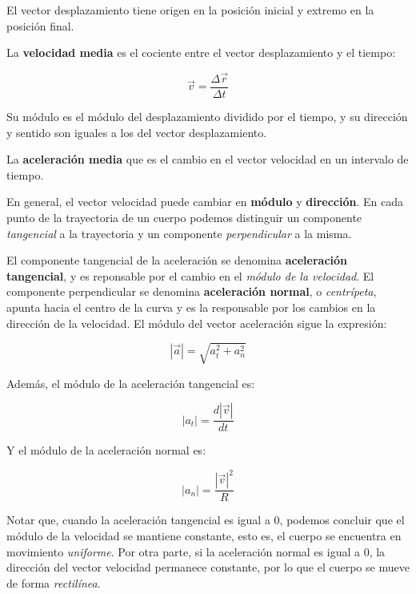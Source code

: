 El vector desplazamiento tiene origen en la posición inicial y extremo en la 
posición final.

La \textbf{velocidad media} es el cociente entre el vector desplazamiento y el 
tiempo:

\begin{equation*}
    \vec{v} = \frac{\Delta\vec{r}}{\Delta t}
\end{equation*}

Su módulo es el módulo del desplazamiento dividido por el tiempo,
y su dirección y sentido son iguales a los del vector desplazamiento.

La \textbf{aceleración media} que es el cambio en el vector velocidad
en un intervalo de tiempo.

En general,
el vector velocidad puede cambiar en \textbf{módulo} y \textbf{dirección}.
En cada punto de la trayectoria de un cuerpo podemos distinguir un componente 
\textit{tangencial} a la trayectoria y un componente \textit{perpendicular} a la
misma.

El componente tangencial de la aceleración se denomina 
\textbf{aceleración tangencial},
y es reponsable por el cambio en el \textit{módulo de la velocidad}.
El componente perpendicular se denomina \textbf{aceleración normal},
o \textit{centrípeta},
apunta hacia el centro de la curva y es la responsable por los cambios en la 
dirección de la velocidad.
El módulo del vector aceleración sigue la expresión:

\begin{equation*}
    |\vec{a}| = \sqrt{a_t^{2} + a_n^{2}}
\end{equation*}

Además, el módulo de la aceleración tangencial es:

\begin{equation*}
    |a_t| = \frac{d|\vec{v}|}{dt}
\end{equation*}

Y el módulo de la aceleración normal es:

\begin{equation*}
    |a_n| = \frac{|\vec{v}|^{2}}{R}
\end{equation*}

Notar que,
cuando la aceleración tangencial es igual a 0,
podemos concluir que el módulo de la velocidad se mantiene constante,
esto es,
el cuerpo se encuentra en movimiento \textit{uniforme}.
Por otra parte,
si la aceleración normal es igual a 0,
la dirección del vector velocidad permanece constante,
por lo que el cuerpo se mueve de forma \textit{rectilínea}.

